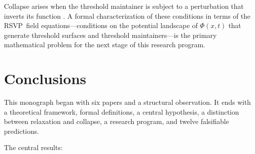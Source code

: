 \documentclass[12pt, a4paper, twoside]{book}
\theoremstyle{definition}
\theoremstyle{remark}
\newcommand{\RSVP}{\textsf{RSVP}}
\begin{document}
Collapse arises when the threshold maintainer is subject to a perturbation that inverts its function \citep{davidson2026, croft2019}. A formal characterization of these conditions in terms of the \RSVP\ field equations---conditions on the potential landscape of $\Phi(x,t)$ that generate threshold surfaces and threshold maintainers---is the primary mathematical problem for the next stage of this research program.

\chapter{Conclusions}
\label{ch:conclusions}

This monograph began with six papers and a structural observation. It ends with a theoretical framework, formal definitions, a central hypothesis, a distinction between relaxation and collapse, a research program, and twelve falsifiable predictions.

The central results:
\end{document}
